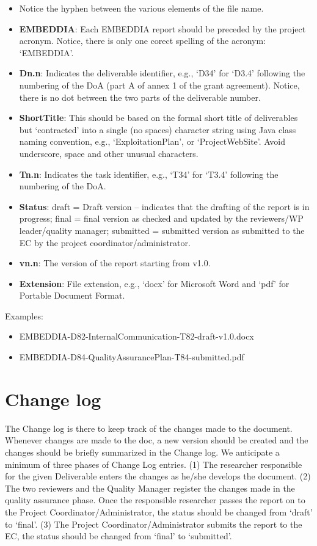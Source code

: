 \documentclass[10pt]{report}
\begin{document}
\begin{itemize}
\item Notice the hyphen between the various elements of the file name.
    \item {\bf EMBEDDIA}: Each EMBEDDIA report should be preceded by the project acronym. Notice, there is only one corect spelling of the acronym: ‘EMBEDDIA’. 
    \item {\bf Dn.n}: Indicates the deliverable identifier, e.g., ‘D34’ for ‘D3.4’ following the numbering of the DoA (part A of annex 1 of the grant agreement). Notice, there is no dot between the two parts of the deliverable number.
    \item {\bf ShortTitle}: This should be based on the formal short title of deliverables but ‘contracted’ into a single (no spaces) character string using Java class naming convention, e.g., ‘ExploitationPlan’,  or ‘ProjectWebSite’. Avoid underscore, space and other unusual characters.
    \item {\bf Tn.n}: Indicates the task identifier, e.g., ‘T34’ for ‘T3.4’ following the numbering of the DoA.
    \item {\bf Status}: 
draft = Draft version – indicates that the drafting of the report is in progress; 
final = final version as checked and updated by the reviewers/WP leader/quality manager; 
submitted = submitted version as submitted to the EC by the project coordinator/administrator.
    \item {\bf vn.n}: The version of the report starting from v1.0. 
    \item {\bf Extension}: File extension, e.g., ‘docx’ for Microsoft Word and ‘pdf’ for Portable Document Format. 
\end{itemize}

Examples:

\begin{itemize}
    \item EMBEDDIA-D82-InternalCommunication-T82-draft-v1.0.docx
    \item EMBEDDIA-D84-QualityAssurancePlan-T84-submitted.pdf
\end{itemize}

\section{Change log}

The Change log is there to keep track of the changes made to the document. Whenever changes are made to the doc, a new version should be created and the changes should be briefly summarized in the Change log. We anticipate a minimum of three phases of Change Log entries. (1) The researcher responsible for the given Deliverable enters the changes as he/she develops the document. (2) The two reviewers and the Quality Manager register the changes made in the quality assurance phase. Once the responsible researcher passes the report on to the Project Coordinator/Administrator, the status should be changed from ‘draft’ to ‘final’. (3) The Project Coordinator/Administrator submits the report to the EC, the status should be changed from ‘final’ to ‘submitted’.
\end{document}

